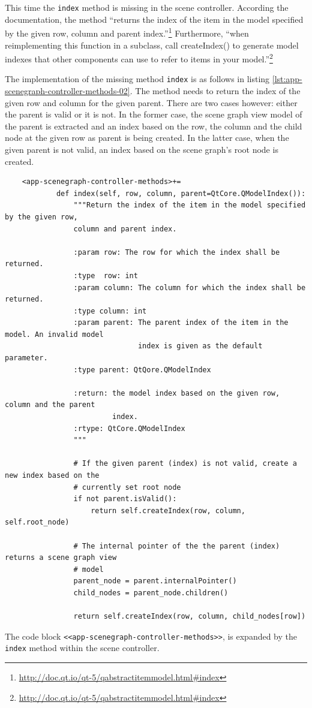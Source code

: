 \documentclass[10pt, openright, notitlepage]{scrreprt}
\begin{document}
This time the \texttt{index} method is missing in the scene controller.
According the documentation, the method ``returns the index of the item in the
model specified by the given row, column and parent
index.''\footnote{\url{http://doc.qt.io/qt-5/qabstractitemmodel.html\#index}}
Furthermore, ``when reimplementing this function in a subclass, call
createIndex() to generate model indexes that other components can use to refer
to items in your
model.''\footnote{\url{http://doc.qt.io/qt-5/qabstractitemmodel.html\#index}}

The implementation of the missing method \texttt{index} is as follows in
listing \ref{lst:app-scenegraph-controller-methods-02}. The method needs to return the
index of the given row and column for the given parent. There are two cases
however: either the parent is valid or it is not. In the former case, the scene
graph view model of the parent is extracted and an index based on the row, the
column and the child node at the given row as parent is being created. In the
latter case, when the given parent is not valid, an index based on the scene
graph's root node is created.

\begin{listing}[H]
\begin{verbatim}
    <app-scenegraph-controller-methods>+=
            def index(self, row, column, parent=QtCore.QModelIndex()):
                """Return the index of the item in the model specified by the given row,
                column and parent index.
            
                :param row: The row for which the index shall be returned.
                :type  row: int
                :param column: The column for which the index shall be returned.
                :type column: int
                :param parent: The parent index of the item in the model. An invalid model
                               index is given as the default parameter.
                :type parent: QtQore.QModelIndex
            
                :return: the model index based on the given row, column and the parent
                         index.
                :rtype: QtCore.QModelIndex
                """
            
                # If the given parent (index) is not valid, create a new index based on the
                # currently set root node
                if not parent.isValid():
                    return self.createIndex(row, column, self.root_node)
            
                # The internal pointer of the the parent (index) returns a scene graph view
                # model
                parent_node = parent.internalPointer()
                child_nodes = parent_node.children()
            
                return self.createIndex(row, column, child_nodes[row])
\end{verbatim}
\caption{\label{lst:app-scenegraph-controller-methods-02}
The code block \texttt{<<app-scenegraph-controller-methods>>}, is expanded by the \texttt{index} method within the scene controller.}
\end{listing}
\end{document}
